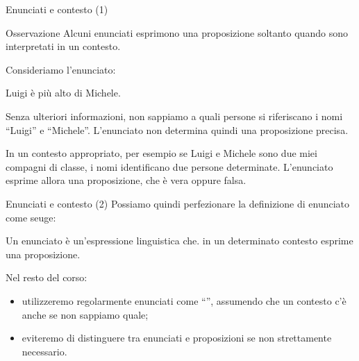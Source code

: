 \documentclass[aspectratio=169,10pt,dvipsnames,handout]{beamer}
\begin{document}
\begin{frame}{Enunciati e contesto (1)}
	\begin{block}{Osservazione}
		Alcuni enunciati esprimono una proposizione soltanto quando sono interpretati in un \alert{contesto}.
	\end{block}

	\begin{example}
		Consideriamo l'enunciato:
		\begin{proposition}
			Luigi è più alto di Michele.
		\end{proposition}
		\pause
		Senza ulteriori informazioni, non sappiamo a quali persone si
		riferiscano i nomi ``Luigi'' e ``Michele''. L'enunciato non determina
		quindi una proposizione precisa.

		\medskip
		In un contesto appropriato, per esempio se Luigi e Michele sono due
		miei compagni di classe, i nomi identificano due persone determinate.
		L'enunciato esprime allora una proposizione, che è vera oppure falsa.
	\end{example}
\end{frame}

\begin{frame}{Enunciati e contesto (2)}
	Possiamo quindi perfezionare la definizione di \alert{enunciato} come seuge:

	\begin{definition}[Enunciato]
		Un \alert{enunciato} è un'espressione linguistica che. \alert{in un determinato contesto} esprime una proposizione.
	\end{definition}

	\pause
	\medskip
	Nel resto del corso:
	\begin{itemize}
		\item utilizzeremo regolarmente enunciati come ``'', assumendo che un contesto c'è anche se non sappiamo quale;
		\item eviteremo di distinguere tra enunciati e proposizioni se non strettamente necessario.
	\end{itemize}
\end{frame}



%
%
\end{document}
